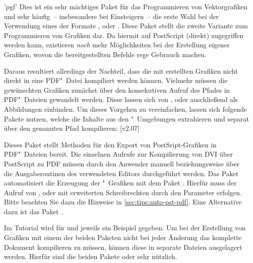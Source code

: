 \begin{DeclarePackages}[Grafiken|?]
'pgf'
  Dies ist ein sehr mächtiges Paket für das Programmieren von Vektorgrafiken 
  und sehr häufig~-- insbesondere bei Einsteigern~-- die erste Wahl bei der 
  Verwendung eines der Formate ,  oder 
  .
  Diese Paket stellt die zweite Variante zum Programmieren von Grafiken dar. 
  Da hiermit auf PostScript (direkt) zugegriffen werden kann, existieren 
  \emph{noch} mehr Möglichkeiten bei der Erstellung eigener Grafiken, wovon
  die bereitgestellten Befehle rege Gebrauch machen.
  
  Daraus resultiert allerdings der Nachteil, dass die mit  
  erstellten Grafiken nicht direkt in eine PDF"~Datei kompiliert werden können. 
  Vielmehr müssen die gewünschten Grafiken zunächst über den konsekutiven 
  Aufruf des Pfades  in PDF"~Dateien gewandelt 
  werden. Diese lassen sich von ,  oder 
   anschließend als Abbildungen einbinden. Um dieses Vorgehen 
  zu vereinfachen, lassen sich folgende Pakete nutzen, welche die Inhalte aus 
  den "~Umgebungen extrahieren und separat über den 
  genannten Pfad kompilieren:
  [v2.07]
  \begin{DeclarePackages}
    Dieses Paket stellt Methoden für den Export von PostSript-Grafiken in 
    PDF"~Dateien bereit. Die einzelnen Aufrufe zur Kompilierung von DVI über 
    PostScript zu PDF müssen durch den Anwender manuell beziehungsweise über 
    die Ausgaberoutinen des verwendeten Editors durchgeführt werden.
    Das Paket automatisiert die Erzeugung der "~Grafiken mit 
    dem Paket . Hierfür muss der Aufruf von , 
     oder  mit erweiterten Schreibrechten 
    durch den Parameter  erfolgen. Bitte beachten Sie 
    dazu die Hinweise in \autoref{sec:tips:auto-pst-pdf}. Eine Alternative dazu 
    ist das Paket .
  \end{DeclarePackages}
\end{DeclarePackages}

Im Tutorial  wird für  und 
 jeweils ein Beispiel gegeben. Um bei der Erstellung von Grafiken 
mit einem der beiden Paketen nicht bei jeder Änderung das komplette Dokument 
kompilieren zu müssen, können diese in separate Dateien ausgelagert werden. 
Hierfür sind die beiden Pakete  oder  
sehr nützlich.

